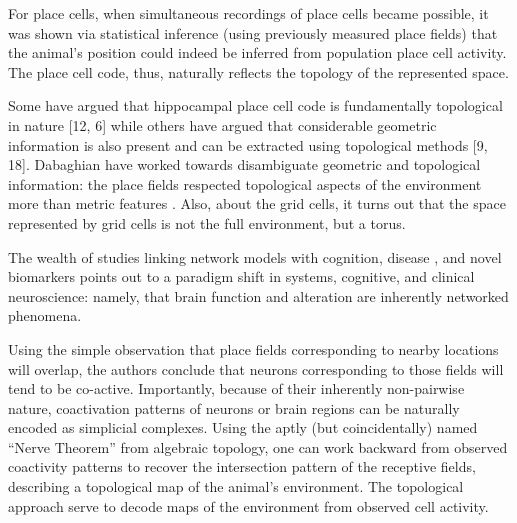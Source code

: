 \documentclass[onecollarge,runningheads]{svjour2}
\begin{document}
For place cells, when simultaneous recordings of place cells became possible, it was shown via statistical inference (using previously measured place fields) that the animal's position could indeed be inferred from population place cell activity. The place cell code, thus, naturally reflects the topology of the represented space.

\cite{curto2016can} Some have argued that hippocampal place cell code is fundamentally topological in nature [12, 6] while others have argued that considerable geometric information is also present and can be extracted using topological methods [9, 18]. Dabaghian have worked towards disambiguate geometric and topological information: the place fields respected topological aspects of the environment more than metric features \cite{dabaghian2014reconceiving}. Also, about the grid cells, it turns out that the space represented by grid cells is not the full environment, but a torus.

The wealth of studies linking network models with cognition, disease \cite{stefan2013epileptic}, \cite{stam2014modern} and novel biomarkers points out to a paradigm shift in systems, cognitive, and clinical neuroscience: namely, that brain function and alteration are inherently networked phenomena.


Using the simple observation that place fields corresponding to nearby locations will overlap, the authors conclude that neurons corresponding to those fields will tend to be co-active. Importantly, because of their inherently non-pairwise nature, coactivation patterns of neurons or brain regions can be naturally encoded as simplicial complexes. 
Using the aptly (but coincidentally) named “Nerve Theorem” from algebraic topology, one can work backward from observed coactivity patterns to recover the intersection pattern of the receptive fields, describing a topological map of the animal’s environment.
The topological approach serve to decode maps of the environment from observed cell activity.
\end{document}
